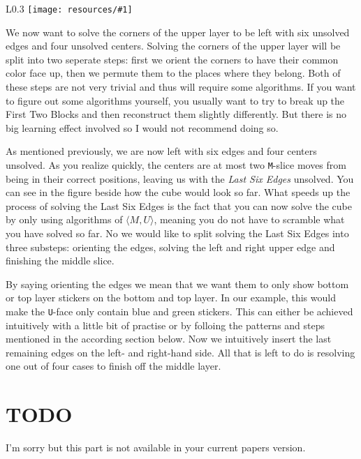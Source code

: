 \documentclass{scrreprt}
\newcommand{\wrapfig}[5] {
	\begin{wrapfigure}{#2}{#3\textwidth}
	\centering
	\texttt{[image: resources/\#1]}
	\caption*{#5}
	\end{wrapfigure}
}
\begin{document}
\wrapfig{lse.png}{L}{0.3}{0.3}{Before the Last Six Edges}

We now want to solve the corners of the upper layer to be left with six unsolved edges and four unsolved centers. Solving the corners of the upper layer will be split into two seperate steps: first we orient the corners to have their common color face up, then we permute them to the places where they belong. Both of these steps are not very trivial and thus will require some algorithms. If you want to figure out some algorithms yourself, you usually want to try to break up the First Two Blocks and then reconstruct them slightly differently. But there is no big learning effect involved so I would not recommend doing so.\par

As mentioned previously, we are now left with six edges and four centers unsolved. As you realize quickly, the centers are at most two \texttt{M}-slice moves from being in their correct positions, leaving us with the \emph{Last Six Edges} unsolved. You can see in the figure beside how the cube would look so far. What speeds up the process of solving the Last Six Edges is the fact that you can now solve the cube by only using algorithms of $\langle M, U\rangle$, meaning you do not have to scramble what you have solved so far. No we would like to split solving the Last Six Edges into three substeps: orienting the edges, solving the left and right upper edge and finishing the middle slice.\par

By saying orienting the edges we mean that we want them to only show bottom or top layer stickers on the bottom and top layer. In our example, this would make the \texttt{U}-face only contain blue and green stickers. This can either be achieved intuitively with a little bit of practise or by folloing the patterns and steps mentioned in the according section below. Now we intuitively insert the last remaining edges on the left- and right-hand side. All that is left to do is resolving one out of four cases to finish off the middle layer.

\chapter{TODO}
I'm sorry but this part is not available in your current papers version.
\end{document}
